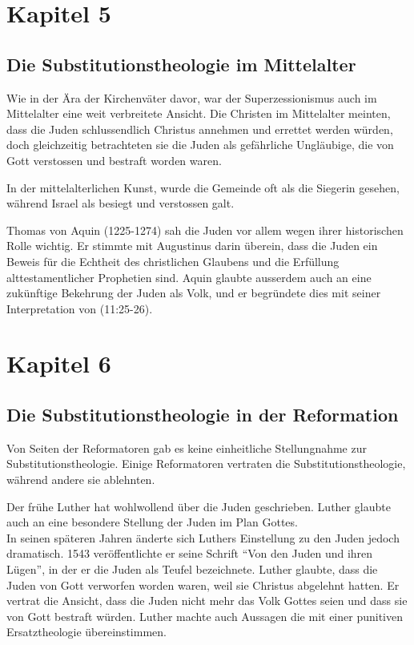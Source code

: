 \documentclass{../../inc/mybib}
\newcommand{\st}{Substitutionstheolog}
\newcommand{\sz}{Superzessionismus}
\begin{document}
    \section{Kapitel 5}
    \subsection{Die \st ie im Mittelalter}
    Wie in der Ära der Kirchenväter davor, war der \sz{} auch im Mittelalter eine weit verbreitete Ansicht. Die Christen im Mittelalter meinten, dass die Juden schlussendlich Christus annehmen und errettet werden würden, doch gleichzeitig betrachteten sie die Juden als gefährliche Ungläubige, die von Gott verstossen und bestraft worden waren.

    In der mittelalterlichen Kunst, wurde die Gemeinde oft als die Siegerin gesehen, während Israel als besiegt und verstossen galt.

    Thomas von Aquin (1225-1274) sah die Juden vor allem wegen ihrer historischen Rolle wichtig. Er stimmte mit Augustinus darin überein, dass die Juden ein Beweis für die Echtheit des christlichen Glaubens und die Erfüllung alttestamentlicher Prophetien sind. Aquin glaubte ausserdem auch an eine zukünftige Bekehrung der Juden als Volk, und er begründete dies mit seiner Interpretation von (11:25-26).
    \section{Kapitel 6}
    \subsection{Die \st ie in der Reformation}
    Von Seiten der Reformatoren gab es keine einheitliche Stellungnahme zur \st ie. Einige Reformatoren vertraten die \st ie, während andere sie ablehnten.

    Der frühe Luther hat wohlwollend über die Juden geschrieben. Luther glaubte auch an eine besondere Stellung der Juden im Plan Gottes.\\
    In seinen späteren Jahren änderte sich Luthers Einstellung zu den Juden jedoch dramatisch. 1543 veröffentlichte er seine Schrift \enquote{Von den Juden und ihren Lügen}, in der er die Juden als Teufel bezeichnete. Luther glaubte, dass die Juden von Gott verworfen worden waren, weil sie Christus abgelehnt hatten. Er vertrat die Ansicht, dass die Juden nicht mehr das Volk Gottes seien und dass sie von Gott bestraft würden. Luther machte auch Aussagen die mit einer punitiven Ersatztheologie übereinstimmen.
\end{document}

